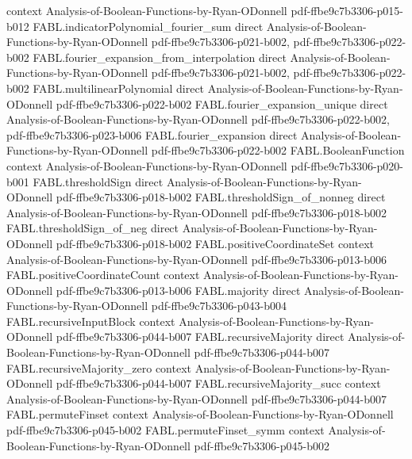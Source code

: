 \begin{theorem}
  {context}
  {Analysis-of-Boolean-Functions-by-Ryan-ODonnell}
  {pdf-ffbe9c7b3306-p015-b012}
\proofstep
  {FABL.indicatorPolynomial_fourier_sum}
  {direct}
  {Analysis-of-Boolean-Functions-by-Ryan-ODonnell}
  {pdf-ffbe9c7b3306-p021-b002,
    pdf-ffbe9c7b3306-p022-b002}
\proofstep
  {FABL.fourier_expansion_from_interpolation}
  {direct}
  {Analysis-of-Boolean-Functions-by-Ryan-ODonnell}
  {pdf-ffbe9c7b3306-p021-b002,
    pdf-ffbe9c7b3306-p022-b002}
\proofstep
  {FABL.multilinearPolynomial}
  {direct}
  {Analysis-of-Boolean-Functions-by-Ryan-ODonnell}
  {pdf-ffbe9c7b3306-p022-b002}
\proofstep
  {FABL.fourier_expansion_unique}
  {direct}
  {Analysis-of-Boolean-Functions-by-Ryan-ODonnell}
  {pdf-ffbe9c7b3306-p022-b002,
    pdf-ffbe9c7b3306-p023-b006}
\proofstep
  {FABL.fourier_expansion}
  {direct}
  {Analysis-of-Boolean-Functions-by-Ryan-ODonnell}
  {pdf-ffbe9c7b3306-p022-b002}
\proofstep
  {FABL.BooleanFunction}
  {context}
  {Analysis-of-Boolean-Functions-by-Ryan-ODonnell}
  {pdf-ffbe9c7b3306-p020-b001}
\proofstep
  {FABL.thresholdSign}
  {direct}
  {Analysis-of-Boolean-Functions-by-Ryan-ODonnell}
  {pdf-ffbe9c7b3306-p018-b002}
\proofstep
  {FABL.thresholdSign_of_nonneg}
  {direct}
  {Analysis-of-Boolean-Functions-by-Ryan-ODonnell}
  {pdf-ffbe9c7b3306-p018-b002}
\proofstep
  {FABL.thresholdSign_of_neg}
  {direct}
  {Analysis-of-Boolean-Functions-by-Ryan-ODonnell}
  {pdf-ffbe9c7b3306-p018-b002}
\proofstep
  {FABL.positiveCoordinateSet}
  {context}
  {Analysis-of-Boolean-Functions-by-Ryan-ODonnell}
  {pdf-ffbe9c7b3306-p013-b006}
\proofstep
  {FABL.positiveCoordinateCount}
  {context}
  {Analysis-of-Boolean-Functions-by-Ryan-ODonnell}
  {pdf-ffbe9c7b3306-p013-b006}
\proofstep
  {FABL.majority}
  {direct}
  {Analysis-of-Boolean-Functions-by-Ryan-ODonnell}
  {pdf-ffbe9c7b3306-p043-b004}
\proofstep
  {FABL.recursiveInputBlock}
  {context}
  {Analysis-of-Boolean-Functions-by-Ryan-ODonnell}
  {pdf-ffbe9c7b3306-p044-b007}
\proofstep
  {FABL.recursiveMajority}
  {direct}
  {Analysis-of-Boolean-Functions-by-Ryan-ODonnell}
  {pdf-ffbe9c7b3306-p044-b007}
\proofstep
  {FABL.recursiveMajority_zero}
  {context}
  {Analysis-of-Boolean-Functions-by-Ryan-ODonnell}
  {pdf-ffbe9c7b3306-p044-b007}
\proofstep
  {FABL.recursiveMajority_succ}
  {context}
  {Analysis-of-Boolean-Functions-by-Ryan-ODonnell}
  {pdf-ffbe9c7b3306-p044-b007}
\proofstep
  {FABL.permuteFinset}
  {context}
  {Analysis-of-Boolean-Functions-by-Ryan-ODonnell}
  {pdf-ffbe9c7b3306-p045-b002}
\proofstep
  {FABL.permuteFinset_symm}
  {context}
  {Analysis-of-Boolean-Functions-by-Ryan-ODonnell}
  {pdf-ffbe9c7b3306-p045-b002}

\end{theorem}
